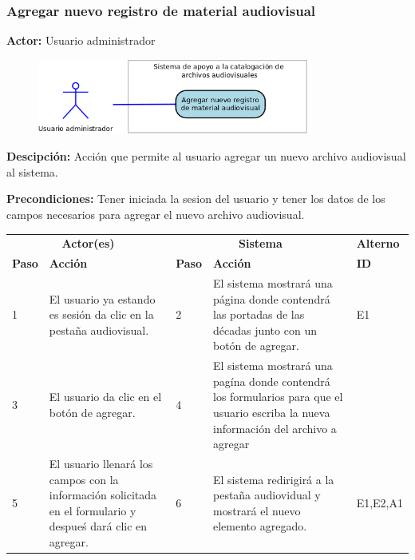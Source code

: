 \documentclass[10pt,letterpaper]{article}
\begin{document}
\subsubsection{Agregar nuevo registro de material audiovisual}
\textbf{Actor:} Usuario administrador

\begin{figure}[H]
	\centering
	\includegraphics[width=0.8\textwidth]{CasoDeUso_Administrador_AgregarNuevoRegistro.png}
\end{figure}

\textbf{Descipción: } Acción que permite al usuario agregar un nuevo archivo audiovisual al sistema.

\textbf{Precondiciones:} Tener iniciada la sesion del usuario y tener los datos de los campos necesarios para agregar el nuevo archivo audiovisual.

\begin{adjustwidth}{-6em}{-6em}
	\begin{center}
		\begin{tabularx}{1.2\textwidth}{ | p{0.7cm} | X | p{0.7cm} | X | p{1.5cm} | }
			\hline
			\rowcolor{NewBlue} \multicolumn{5}{|c|}{\textbf{Flujo normal de eventos}} \\
			\hline
			\multicolumn{2}{|c|}{\textbf{Actor(es)}}	&	\multicolumn{2}{c|}{\textbf{Sistema}}	&	\textbf{Alterno} \\
			\hline
			\textbf{Paso}	&	\textbf{Acción}	&	\textbf{Paso}	&	\textbf{Acción}	&	\textbf{ID} \\
			\hline
			1 & 
			 El usuario ya estando es sesión da clic en la pestaña audiovisual.&
			2 &
			El sistema mostrará una página donde contendrá las portadas de las décadas junto con un botón de agregar.&
			E1
			\\
			\hline
			3 & 
			 El usuario da clic en el botón de agregar.&
			4 &
			El sistema mostrará una pagína donde contendrá los formularios para que el usuario escriba la nueva información del archivo a agregar&
			\\
			\hline
			5 & 
			 El usuario llenará los campos con la información solicitada en el formulario y despueś dará clic en agregar.&
			6 &
			El sistema redirigirá a la pestaña audiovidual y mostrará el nuevo elemento agregado.&
			E1,E2,A1
			\\
			\hline
		\end{tabularx}
	\end{center}
\end{adjustwidth}
\end{document}
